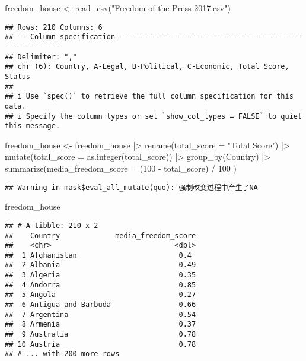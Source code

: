 \documentclass[
]{article}
\newenvironment{Shaded}{\begin{snugshade}}{\end{snugshade}}
\newcommand{\AttributeTok}[1]{\textcolor[rgb]{0.77,0.63,0.00}{#1}}
\newcommand{\DecValTok}[1]{\textcolor[rgb]{0.00,0.00,0.81}{#1}}
\newcommand{\FunctionTok}[1]{\textcolor[rgb]{0.00,0.00,0.00}{#1}}
\newcommand{\NormalTok}[1]{#1}
\newcommand{\OtherTok}[1]{\textcolor[rgb]{0.56,0.35,0.01}{#1}}
\newcommand{\SpecialCharTok}[1]{\textcolor[rgb]{0.00,0.00,0.00}{#1}}
\newcommand{\StringTok}[1]{\textcolor[rgb]{0.31,0.60,0.02}{#1}}
\begin{document}
\begin{Shaded}
\begin{Highlighting}[]
\NormalTok{freedom\_house }\OtherTok{\textless{}{-}} \FunctionTok{read\_csv}\NormalTok{(}\StringTok{"Freedom of the Press 2017.csv"}\NormalTok{)}
\end{Highlighting}
\end{Shaded}

\begin{verbatim}
## Rows: 210 Columns: 6
## -- Column specification --------------------------------------------------------
## Delimiter: ","
## chr (6): Country, A-Legal, B-Political, C-Economic, Total Score, Status
## 
## i Use `spec()` to retrieve the full column specification for this data.
## i Specify the column types or set `show_col_types = FALSE` to quiet this message.
\end{verbatim}

\begin{Shaded}
\begin{Highlighting}[]
\NormalTok{freedom\_house }\OtherTok{\textless{}{-}}\NormalTok{ freedom\_house }\SpecialCharTok{|\textgreater{}}
  \FunctionTok{rename}\NormalTok{(}\AttributeTok{total\_score =} \StringTok{"Total Score"}\NormalTok{) }\SpecialCharTok{|\textgreater{}}
  \FunctionTok{mutate}\NormalTok{(}\AttributeTok{total\_score =} \FunctionTok{as.integer}\NormalTok{(total\_score)) }\SpecialCharTok{|\textgreater{}}
  \FunctionTok{group\_by}\NormalTok{(Country) }\SpecialCharTok{|\textgreater{}}
  \FunctionTok{summarize}\NormalTok{(}\AttributeTok{media\_freedom\_score =}\NormalTok{ (}\DecValTok{100} \SpecialCharTok{{-}}\NormalTok{ total\_score) }\SpecialCharTok{/} \DecValTok{100}
\NormalTok{            )}
\end{Highlighting}
\end{Shaded}

\begin{verbatim}
## Warning in mask$eval_all_mutate(quo): 强制改变过程中产生了NA
\end{verbatim}

\begin{Shaded}
\begin{Highlighting}[]
\NormalTok{freedom\_house}
\end{Highlighting}
\end{Shaded}

\begin{verbatim}
## # A tibble: 210 x 2
##    Country             media_freedom_score
##    <chr>                             <dbl>
##  1 Afghanistan                        0.4 
##  2 Albania                            0.49
##  3 Algeria                            0.35
##  4 Andorra                            0.85
##  5 Angola                             0.27
##  6 Antigua and Barbuda                0.66
##  7 Argentina                          0.54
##  8 Armenia                            0.37
##  9 Australia                          0.78
## 10 Austria                            0.78
## # ... with 200 more rows
\end{verbatim}
\end{document}

